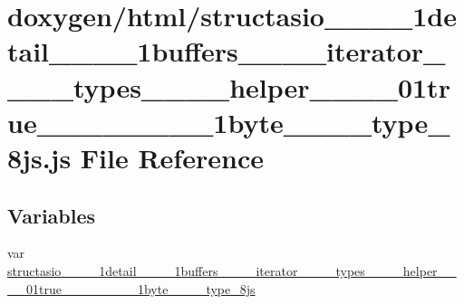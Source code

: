 \hypertarget{structasio____1____1detail____1____1buffers________iterator________types________helper____3____00d830caa67be3910b819a7e5c3688ab1}{}\section{doxygen/html/structasio\+\_\+\+\_\+\_\+\+\_\+1detail\+\_\+\+\_\+\_\+\+\_\+1buffers\+\_\+\+\_\+\+\_\+\+\_\+iterator\+\_\+\+\_\+\+\_\+\+\_\+types\+\_\+\+\_\+\+\_\+\+\_\+helper\+\_\+\+\_\+\_\+\+\_\+01true\+\_\+\+\_\+\_\+\+\_\+\_\+\+\_\+\_\+\+\_\+1byte\+\_\+\+\_\+\+\_\+\+\_\+type\+\_\+8js.js File Reference}
\label{structasio____1____1detail____1____1buffers________iterator________types________helper____3____00d830caa67be3910b819a7e5c3688ab1}
\subsection*{Variables}
\begin{DoxyCompactItemize}
\item 
var \hyperlink{structasio____1____1detail____1____1buffers________iterator________types________helper____3____00d830caa67be3910b819a7e5c3688ab1_aa7b8a1f39043344b1c679a076d3ee379}{structasio\+\_\+\+\_\+\_\+\+\_\+1detail\+\_\+\+\_\+\_\+\+\_\+1buffers\+\_\+\+\_\+\+\_\+\+\_\+iterator\+\_\+\+\_\+\+\_\+\+\_\+types\+\_\+\+\_\+\+\_\+\+\_\+helper\+\_\+\+\_\+\_\+\+\_\+01true\+\_\+\+\_\+\_\+\+\_\+\_\+\+\_\+\_\+\+\_\+1byte\+\_\+\+\_\+\+\_\+\+\_\+type\+\_\+8js}
\end{DoxyCompactItemize}


